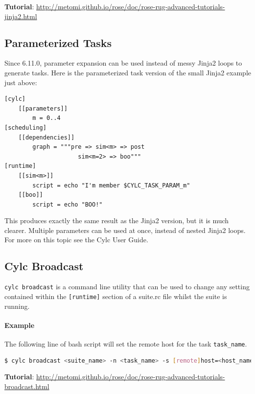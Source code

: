 \begin{shaded*}
\textbf{Tutorial}: \url{http://metomi.github.io/rose/doc/rose-rug-advanced-tutorials-jinja2.html}
\end{shaded*}

\subsection{Parameterized Tasks}

Since 6.11.0, parameter expansion can be used instead of messy Jinja2 loops
to generate tasks. Here is the parameterized task version of the
small Jinja2 example just above:

\begin{lstlisting}
[cylc]
    [[parameters]]
        m = 0..4
[scheduling]
    [[dependencies]]
        graph = """pre => sim<m> => post
                     sim<m=2> => boo"""
[runtime]
    [[sim<m>]]
        script = echo "I'm member $CYLC_TASK_PARAM_m"
    [[boo]]
        script = echo "BOO!"
\end{lstlisting}

This produces exactly the same result as the Jinja2 version, but it is much
clearer. Multiple parameters can be used at once, instead of nested Jinja2
loops.  For more on this topic see the Cylc User Guide.


\subsection{Cylc Broadcast}

\lstinline[language=bash]{cylc broadcast} is a command line utility that can
be used to change any setting contained within the \lstinline{[runtime]}
section of a suite.rc file whilst the suite is running.

\paragraph*{Example} The following line of bash script will set the remote
host for the task \lstinline{task_name}.

\begin{lstlisting}[language=bash]
$ cylc broadcast <suite_name> -n <task_name> -s [remote]host=<host_name>
\end{lstlisting}

\begin{shaded*}
\textbf{Tutorial}: \url{http://metomi.github.io/rose/doc/rose-rug-advanced-tutorials-broadcast.html}
\end{shaded*}

